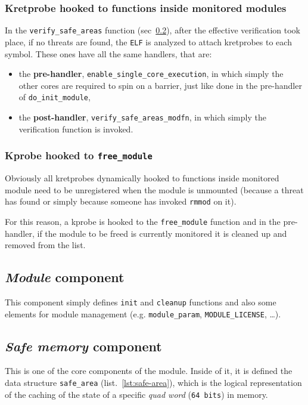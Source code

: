\documentclass{article}
\begin{document}
	\subsubsection{Kretprobe hooked to functions inside monitored modules}
	In the \texttt{verify\_safe\_areas} function (sec~\ref{sec:safemem}), after the effective verification took place,
	if no threats are found, the \texttt{ELF} is analyzed to attach kretprobes to each symbol. These ones have all the
	same handlers, that are:
	\begin{itemize}
		\item the \textbf{pre-handler}, \texttt{enable\_single\_core\_execution}, in which simply the other cores are
		required to spin on a barrier, just like done in the pre-handler of \texttt{do\_init\_module},
		\item the \textbf{post-handler}, \texttt{verify\_safe\_areas\_modfn}, in which simply the verification function
		is invoked.
	\end{itemize}

	\subsubsection{Kprobe hooked to \texttt{free\_module}}
	Obviously all kretprobes dynamically hooked to functions inside monitored module need to be unregistered when the
	module is unmounted (because a threat has found or simply because someone has invoked \texttt{rmmod} on it).

	For this reason, a kprobe is hooked to the \texttt{free\_module} function and in the pre-handler, if the
	module to be freed is currently monitored it is cleaned up and removed from the list.

	\subsection{\textsl{Module} component}\label{sec:module}
	This component simply defines \texttt{init} and \texttt{cleanup} functions and also some elements for module
	management (e.g. \texttt{module\_param}, \texttt{MODULE\_LICENSE}, \dots).

	\subsection{\textsl{Safe memory} component}\label{sec:safemem}
	This is one of the core components of the module. Inside of it, it is defined the data structure
	\texttt{safe\_area} (list.~\ref{lst:safe-area}), which is the logical representation of the caching of the state of
	a specific \textit{quad word} (\texttt{64 bits}) in memory.
\end{document}
